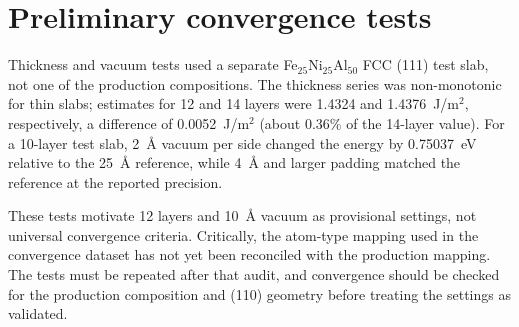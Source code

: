 \section{Preliminary convergence tests}
Thickness and vacuum tests used a separate Fe$_{25}$Ni$_{25}$Al$_{50}$ FCC (111) test slab, not one of the production compositions. The thickness series was non-monotonic for thin slabs; estimates for 12 and 14 layers were 1.4324 and 1.4376~J/m$^2$, respectively, a difference of 0.0052~J/m$^2$ (about 0.36\% of the 14-layer value). For a 10-layer test slab, 2~\AA{} vacuum per side changed the energy by 0.75037~eV relative to the 25~\AA{} reference, while 4~\AA{} and larger padding matched the reference at the reported precision.

These tests motivate 12 layers and 10~\AA{} vacuum as provisional settings, not universal convergence criteria. Critically, the atom-type mapping used in the convergence dataset has not yet been reconciled with the production mapping. The tests must be repeated after that audit, and convergence should be checked for the production composition and (110) geometry before treating the settings as validated.
